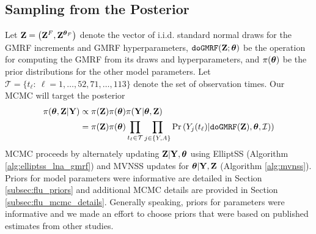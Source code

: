 \subsection{Sampling from the Posterior}
\label{subsec:flu_mcmc}

Let $ \mathbf{Z} = \left (\mathbf{Z}^F,\mathbf{Z}^{\boldsymbol{\theta}_F}\right ) $ denote the vector of i.i.d. standard normal draws for the GMRF increments and GMRF hyperparameters, $ \texttt{doGMRF}(\mathbf{Z};\boldsymbol{\theta}) $ be the operation for computing the GMRF from its draws and hyperparameters, and $ \pi(\boldsymbol{\theta}) $ be the prior distributions for the other model parameters. Let $ \mathcal{T} = \lbrace t_\ell:\ \ell = 1,\dots,52,71,\dots,113 \rbrace $ denote the set of observation times. Our MCMC will target the posterior
\begin{align}
\label{eqn:flu_posterior}
\pi(\boldsymbol{\theta},\mathbf{Z} | \mathbf{Y}) &\propto \pi(\mathbf{Z})\pi(\boldsymbol{\theta})\pi(\mathbf{Y}|\boldsymbol{\theta},\mathbf{Z}) \nonumber\\
&= \pi(\mathbf{Z})\pi(\boldsymbol{\theta}) \prod_{t_\ell\in\mathcal{T}}\prod_{j\in\lbrace Y,A\rbrace} \Pr\left (Y_{j}(t_\ell) | \texttt{doGMRF}(\mathbf{Z}),\boldsymbol{\theta},\mathcal{I})\right )
\end{align}
MCMC proceeds by alternately updating $ \mathbf{Z}|\mathbf{Y},\boldsymbol{\theta} $ using ElliptSS (Algorithm \ref{alg:elliptss_lna_gmrf}) and MVNSS updates for $ \boldsymbol{\theta}|\mathbf{Y},\mathbf{Z} $ (Algorithm \ref{alg:mvnss}). Priors for model parameters were informative are detailed in Section \ref{subsec:flu_priors} and additional MCMC details are provided in Section \ref{subsec:flu_mcmc_details}. Generally speaking, priors for parameters were informative and we made an effort to choose priors that were based on published estimates from other studies.



